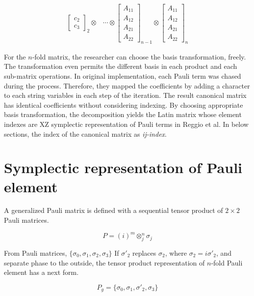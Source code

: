 \documentclass[twocolumn]{article}
\begin{document}
\begin{eqnarray}
\begin{bmatrix}
        c_2\\
        c_3
    \end{bmatrix}_2 \otimes
    &\cdots \otimes
    \begin{bmatrix}
        A_{11} \\
        A_{12} \\
        A_{21} \\
        A_{22}
    \end{bmatrix}_{n-1} \otimes
    \begin{bmatrix}
        A_{11} \\
        A_{12} \\
        A_{21} \\
        A_{22}
    \end{bmatrix}_n\nonumber
\end{eqnarray}

For the $n$-fold matrix, the researcher can choose the basis transformation, freely.
The transformation even permits the different basis in each product and each sub-matrix
operations. 
In original implementation, each Pauli term was chased during the process. 
Therefore, they mapped the coefficients by adding a character to each string variables 
in each step of the iteration. 
The result canonical matrix has identical coefficients without considering indexing.
By choosing appropriate basis transformation, the decomposition yields the Latin matrix whose element indexes are XZ symplectic representation
of Pauli terms in Reggio et al\cite{reggio_fast_2023}.
In below sections, the index of the canonical matrix as \textit{ij-index}.

\section{Symplectic representation of Pauli element}

A generalized Pauli matrix is defined with a sequential tensor product of 
$2\times 2$ Pauli matrices.

\begin{equation}
    P = (i)^m \otimes_j^n \sigma_j
\end{equation}

From Pauli matrices, $\{\sigma_0, \sigma_1, \sigma_2, \sigma_3\}$
If $\sigma'_2$ replaces $\sigma_2$, where $\sigma_2 = i \sigma'_2$,
and separate phase to the outside,
the tensor product representation of $n$-fold Pauli element has a next form.

\begin{equation}
    P_{g} = \{\sigma_0 , \sigma_1, \sigma'_2, \sigma_3\}
\end{equation}
\end{document}
